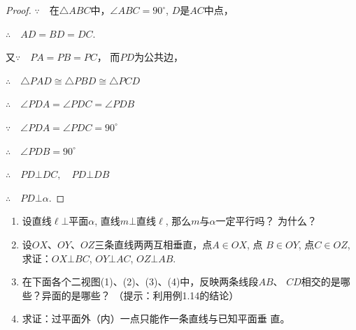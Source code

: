 \begin{figure}[htp]
  \centering
{}
  \caption{}
\end{figure}

\begin{proof}
$\because\quad $在$\triangle ABC$中，$\angle ABC=90^{\circ}$, $D$是$AC$中点，

$\therefore\quad AD=BD=DC$.

又$\because\quad PA=PB=PC$，
而$PD$为公共边，

$\therefore\quad \triangle PAD\cong \triangle PBD\cong \triangle PCD$

$\therefore\quad \angle PDA=\angle PDC=\angle PDB$

$\because\quad \angle PDA=\angle PDC=90^{\circ}$

$\therefore\quad \angle PDB=90^{\circ}$

$\therefore\quad PD\bot DC,\quad PD\bot DB$

$\therefore\quad PD\bot \alpha$.
\end{proof}

\begin{ex}
\begin{enumerate}
  \item 设直线$\ell\bot$平面$\alpha$, 直线$m\bot $直线$\ell$, 那么$m$与$\alpha$一定平行吗？
  为什么？
  \item 设$OX$、$OY$、$OZ$三条直线两两互相垂直，点$A\in OX$, 点
  $B\in OY$, 点$C\in OZ$, 求证：$OX\bot BC$, $OY\bot AC$, $OZ\bot 
  AB$.
  \item 在下面各个二视图(1)、(2)、(3)、(4)中，反映两条线段$AB$、
  $CD$相交的是哪些？异面的是哪些？
  （提示：利用例1.14的结论）
  \item 求证：过平面外（内）一点只能作一条直线与已知平面垂
  直。
\end{enumerate}
\end{ex}

